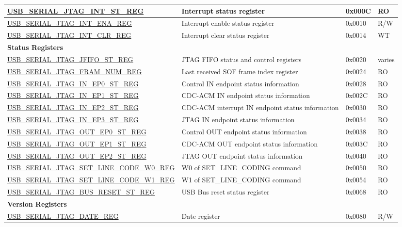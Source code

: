 \begin{longtable}{ | p{7.3cm} | p{5.7cm} | p{1.2cm} | p{1.5cm} | }
\hyperref[regdesc:USBSERIALJTAGINTSTREG]{USB\_SERIAL\_JTAG\_INT\_ST\_REG} & Interrupt status register & 0x000C & RO \\ \hline
\hyperref[regdesc:USBSERIALJTAGINTENAREG]{USB\_SERIAL\_JTAG\_INT\_ENA\_REG} & Interrupt enable status register & 0x0010 & R/W \\ \hline
\hyperref[regdesc:USBSERIALJTAGINTCLRREG]{USB\_SERIAL\_JTAG\_INT\_CLR\_REG} & Interrupt clear status register & 0x0014 & WT \\ \hline
\multicolumn{4}{|l|}{\textbf{Status Registers}} \\ \hline
\hyperref[regdesc:USBSERIALJTAGJFIFOSTREG]{USB\_SERIAL\_JTAG\_JFIFO\_ST\_REG} & JTAG FIFO status and control registers & 0x0020 & varies \\ \hline
\hyperref[regdesc:USBSERIALJTAGFRAMNUMREG]{USB\_SERIAL\_JTAG\_FRAM\_NUM\_REG} & Last received SOF frame index register & 0x0024 & RO \\ \hline
\hyperref[regdesc:USBSERIALJTAGINEP0STREG]{USB\_SERIAL\_JTAG\_IN\_EP0\_ST\_REG} & Control IN endpoint status information & 0x0028 & RO \\ \hline
\hyperref[regdesc:USBSERIALJTAGINEP1STREG]{USB\_SERIAL\_JTAG\_IN\_EP1\_ST\_REG} & CDC-ACM IN endpoint status information & 0x002C & RO \\ \hline
\hyperref[regdesc:USBSERIALJTAGINEP2STREG]{USB\_SERIAL\_JTAG\_IN\_EP2\_ST\_REG} & CDC-ACM interrupt IN endpoint status information & 0x0030 & RO \\ \hline
\hyperref[regdesc:USBSERIALJTAGINEP3STREG]{USB\_SERIAL\_JTAG\_IN\_EP3\_ST\_REG} & JTAG IN endpoint status information & 0x0034 & RO \\ \hline
\hyperref[regdesc:USBSERIALJTAGOUTEP0STREG]{USB\_SERIAL\_JTAG\_OUT\_EP0\_ST\_REG} & Control OUT endpoint status information & 0x0038 & RO \\ \hline
\hyperref[regdesc:USBSERIALJTAGOUTEP1STREG]{USB\_SERIAL\_JTAG\_OUT\_EP1\_ST\_REG} & CDC-ACM OUT endpoint status information & 0x003C & RO \\ \hline
\hyperref[regdesc:USBSERIALJTAGOUTEP2STREG]{USB\_SERIAL\_JTAG\_OUT\_EP2\_ST\_REG} & JTAG OUT endpoint status information & 0x0040 & RO \\ \hline
\hyperref[regdesc:USBSERIALJTAGSETLINECODEW0REG]{USB\_SERIAL\_JTAG\_SET\_LINE\_CODE\_W0\_REG} & W0 of SET\_LINE\_CODING command & 0x0050 & RO \\ \hline
\hyperref[regdesc:USBSERIALJTAGSETLINECODEW1REG]{USB\_SERIAL\_JTAG\_SET\_LINE\_CODE\_W1\_REG} & W1 of SET\_LINE\_CODING command & 0x0054 & RO \\ \hline
\hyperref[regdesc:USBSERIALJTAGBUSRESETSTREG]{USB\_SERIAL\_JTAG\_BUS\_RESET\_ST\_REG} & USB Bus reset status register & 0x0068 & RO \\ \hline
\multicolumn{4}{|l|}{\textbf{Version Registers}} \\ \hline
\hyperref[regdesc:USBSERIALJTAGDATEREG]{USB\_SERIAL\_JTAG\_DATE\_REG} & Date register & 0x0080 & R/W \\ \hline
\end{longtable}

